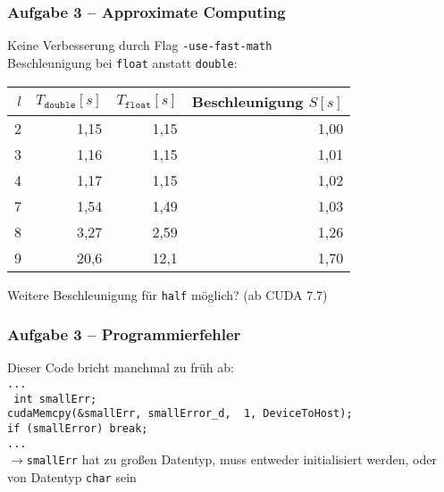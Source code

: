 \documentclass[german,notes,18pt]{beamer}
\begin{document}
	\begin{frame}
		\frametitle{Aufgabe 3 -- Approximate Computing}
		Keine Verbesserung durch Flag \texttt{-use-fast-math} \\
		\vspace{2em}
		Beschleunigung bei \texttt{float} anstatt \texttt{double}:
		\begin{center}
			\begin{tabular}{r|r|r|r}
				$l$ & $T_\mathtt{double}[s]$ & $T_\mathtt{float}[s]$ & Beschleunigung $S[s]$ \\
				\hline
				2 & 1,15 & 1,15 & 1,00 \\
				3 & 1,16 & 1,15 & 1,01 \\
				4 & 1,17 & 1,15 & 1,02 \\
				7 & 1,54 & 1,49 & 1,03 \\
				8 & 3,27 & 2,59 & 1,26 \\
				9 & 20,6 & 12,1 & 1,70
			\end{tabular}
		\end{center}
		\vspace{2em}
		Weitere Beschleunigung für \texttt{half} möglich? (ab CUDA 7.7)
	\end{frame}
	\begin{frame}
		\frametitle{Aufgabe 3 -- Programmierfehler}
		Dieser Code bricht manchmal zu früh ab: \\
		\vspace{1em}
		\texttt{... \\
			{ int} smallErr; \\
			cudaMemcpy(\&smallErr, smallError\_d, { 1}, DeviceToHost); \\
			if (smallError) break; \\
			...} \\
		\vspace{2em}
		\pause
		$\rightarrow$\texttt{smallErr} hat zu großen Datentyp, muss entweder initialisiert werden, oder von Datentyp \texttt{char} sein
	\end{frame}
\end{document}
